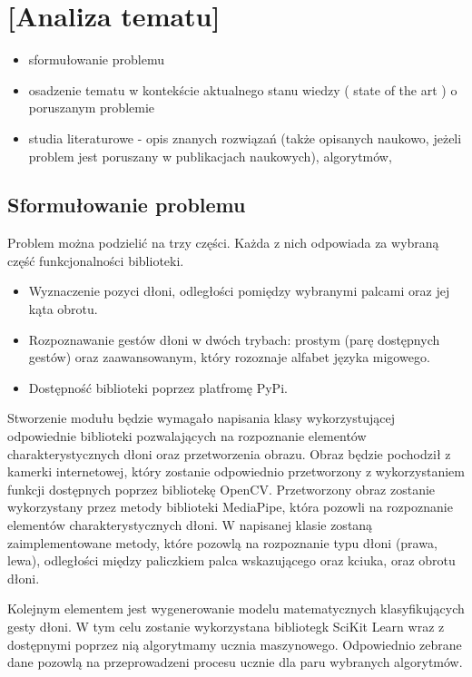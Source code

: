\chapter{[Analiza tematu]}

\begin{itemize}
\item sformułowanie problemu
\item osadzenie tematu w kontekście aktualnego stanu wiedzy ( state of the art ) o poruszanym problemie
\item  studia literaturowe \cite{bib:artykul,bib:ksiazka,bib:konferencja,bib:url} -  opis znanych rozwiązań (także opisanych naukowo, jeżeli problem jest poruszany w publikacjach naukowych), algorytmów, 
\end{itemize}

\section {Sformułowanie problemu}
\quad Problem można podzielić na trzy części. Każda z nich odpowiada za wybraną część funkcjonalności biblioteki. 

\begin{itemize}
    \item Wyznaczenie pozyci dłoni, odległości pomiędzy wybranymi palcami oraz jej kąta obrotu. 
    \item Rozpoznawanie gestów dłoni w dwóch trybach: prostym (parę dostępnych gestów) oraz zaawansowanym, który rozoznaje alfabet języka migowego. 
    \item Dostępność biblioteki poprzez platfromę PyPi. 
\end{itemize}

\quad Stworzenie modułu będzie wymagało napisania klasy wykorzystującej odpowiednie biblioteki pozwalających na rozpoznanie elementów charakterystycznych dłoni oraz przetworzenia obrazu. Obraz będzie pochodził z kamerki internetowej, który zostanie odpowiednio przetworzony z wykorzystaniem funkcji dostępnych poprzez bibliotekę OpenCV. Przetworzony obraz zostanie wykorzystany przez metody biblioteki MediaPipe, która pozowli na rozpoznanie elementów charakterystycznych dłoni. W napisanej klasie zostaną zaimplementowane metody, które pozowlą na rozpoznanie typu dłoni (prawa, lewa), odległości między paliczkiem palca wskazującego oraz kciuka, oraz obrotu dłoni. 

\quad Kolejnym elementem jest wygenerowanie modelu matematycznych klasyfikujących gesty dłoni. W tym celu zostanie wykorzystana bibliotegk SciKit Learn wraz z dostępnymi poprzez nią algorytmamy ucznia maszynowego. Odpowiednio zebrane dane pozowlą na przeprowadzeni procesu ucznie dla paru wybranych algorytmów. 

